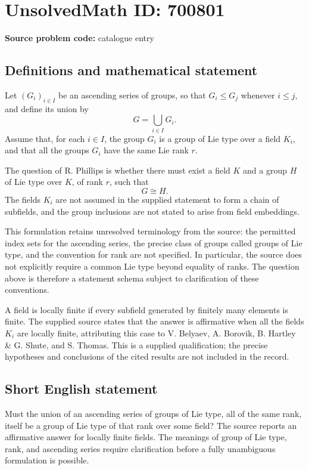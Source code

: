 \documentclass[11pt]{article}
\begin{document}
\section*{UnsolvedMath ID: 700801}
\textbf{Source problem code:} catalogue entry
\subsection{Definitions and mathematical statement}
Let \((G_i)_{i\in I}\) be an ascending series of groups, so that \(G_i\leq G_j\) whenever \(i\leq j\), and define its union by
\[
G=\bigcup_{i\in I}G_i.
\]
Assume that, for each \(i\in I\), the group \(G_i\) is a group of Lie type over a field \(K_i\), and that all the groups \(G_i\) have the same Lie rank \(r\).

The question of R. Phillips is whether there must exist a field \(K\) and a group \(H\) of Lie type over \(K\), of rank \(r\), such that
\[
G\cong H.
\]
The fields \(K_i\) are not assumed in the supplied statement to form a chain of subfields, and the group inclusions are not stated to arise from field embeddings.

This formulation retains unresolved terminology from the source: the permitted index sets for the ascending series, the precise class of groups called groups of Lie type, and the convention for rank are not specified. In particular, the source does not explicitly require a common Lie type beyond equality of ranks. The question above is therefore a statement schema subject to clarification of these conventions.

A field is locally finite if every subfield generated by finitely many elements is finite. The supplied source states that the answer is affirmative when all the fields \(K_i\) are locally finite, attributing this case to V. Belyaev, A. Borovik, B. Hartley \& G. Shute, and S. Thomas. This is a supplied qualification; the precise hypotheses and conclusions of the cited results are not included in the record.
\subsection{Short English statement}
Must the union of an ascending series of groups of Lie type, all of the same rank, itself be a group of Lie type of that rank over some field? The source reports an affirmative answer for locally finite fields. The meanings of group of Lie type, rank, and ascending series require clarification before a fully unambiguous formulation is possible.
\end{document}
